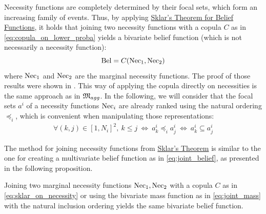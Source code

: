 Necessity functions are completely determined by their focal sets, which form an increasing family of events. Thus, by applying \hyperref[theorem:sklarbelief]{Sklar's Theorem for Belief Functions}, it holds that joining two necessity functions with a copula $C$ as in \eqref{eq:copula_on_lower_proba} yields a bivariate belief function (which is not necessarily a necessity function):
\begin{equation}
    \mathrm{Bel} = C(\mathrm{Nec}_1, \mathrm{Nec}_2)\label{eq:sklar_on_necessity}
\end{equation}
where $\mathrm{Nec}_1$ and $\mathrm{Nec}_2$ are the marginal necessity functions. The proof of those results were shown in \cite{schmelzer_joint_2015,schmelzer_sklars_2015}. This way of applying the copula directly on necessities is the same approach as in $\mathfrak{M}_{agg}$. In the following, we will consider that the focal sets $a^i$ of a necessity functions $\mathrm{Nec}_i$ are already ranked using the natural ordering $\preceq_i$, which is convenient when manipulating those representations:
\begin{eqnarray}
    \forall (k,j)\in[1, N_i]^2,~k\leqslant j ~\Leftrightarrow ~ a^i_k \preceq_i a^i_j ~\Leftrightarrow ~ a^i_k\subseteq a^i_j
\end{eqnarray}

The method for joining necessity functions from \hyperref[theorem:sklar]{Sklar's Theorem} is similar to the one for creating a multivariate belief function as in \eqref{eq:joint_belief}, as presented in the following proposition.

\begin{proposition}\label{prop:sklar_necessity}
    Joining two marginal necessity functions $\mathrm{Nec}_1, \mathrm{Nec}_2$ with a copula $C$ as in \eqref{eq:sklar_on_necessity} or using the bivariate mass function as in \eqref{eq:joint_mass} with the natural inclusion ordering yields the same bivariate belief function.
\end{proposition}

